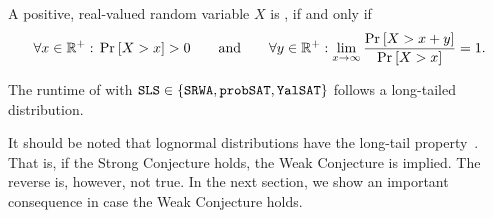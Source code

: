 \begin{definition}
	\label{def:long_tail}
	A positive, real-valued random variable $X$ is , if and only if
	\begin{align*}
		\forall x\in \mathbb{R}^{+}:\, \operatorname{\mathrm{Pr}}_{} \left[ X>x \right] > 0
		\quad \quad \textnormal{and} \quad \quad
		\forall y\in \mathbb{R}^{+}: \lim\limits_{x\rightarrow \infty} \frac{\operatorname{\mathrm{Pr}}_{} \left[ X > x+y \right]}{\operatorname{\mathrm{Pr}}_{} \left[ X>x \right]} = 1.
	\end{align*}
\end{definition}
\begin{conjecture}
	\label{conj:weak}
	The runtime of \Alfa{} with $\texttt{SLS} \in \{ \texttt{SRWA}, \texttt{probSAT}, \texttt{YalSAT} \}$ follows a long-tailed distribution.
\end{conjecture}


It should be noted that lognormal distributions have the long-tail property~\cite{foss2011introduction,nair2020fundamentals}. That is, if the Strong Conjecture holds, the Weak Conjecture is implied. The reverse is, however, not true. In the next section, we show an important consequence in case the Weak Conjecture holds.









